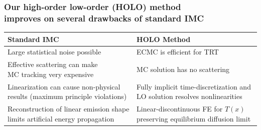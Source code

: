 \documentclass[xcolor=dvipsnames,hyperref={pdfpagelabels=false},unknownkeysallowed]{beamer}
\newcommand{\colb}[1]{{\color{blue} #1}}
\newcommand{\colG}[1]{{\color{Gray!110} #1}}
\newcommand{\colr}[1]{{\color{red} #1}}
\newlength{\tabsep}
\begin{document}
\begin{frame}
\frametitle{Our {high-order low-order (HOLO) method} \\  improves on several drawbacks of standard IMC}
    \begin{center}
{\footnotesize
\begin{tabular}{p{} p{}} 
    \multicolumn{1}{l}{\textbf{\normalsize Standard  IMC}} & \multicolumn{1}{l}{\textbf{\normalsize
    HOLO Method}} \\ \hline [2pt]
    \parbox{0.4\textwidth}{Large \colr{statistical noise} possible} & 
    \parbox{0.5\textwidth}{ECMC is \colb{efficient} for TRT} \\ [\tabsep]
 \parbox{0.4\textwidth}{{\color{red}Effective scattering} can make \\ MC tracking very expensive}
 & \parbox{0.4\textwidth}{MC solution has \colb{no
 scattering}} \\[\tabsep] 
 \parbox{0.5\textwidth}{Linearization can cause \colr{non-physical}\\ results  (maximum principle
 violations)} & \parbox{0.5\textwidth}{Fully \colb{implicit} time-discretization
 and \\ LO solution \colb{resolves nonlinearities}} \\[\tabsep] 
 \parbox{0.5\textwidth}{\colG{Reconstruction of linear emission shape limits artificial energy propagation}} &
 \parbox{0.5\textwidth}{Linear-discontinuous FE for $T(x)$ \\ \colb{preserving equilibrium diffusion limit} }
\end{tabular}
}
\end{center}
\end{frame}
\end{document}
